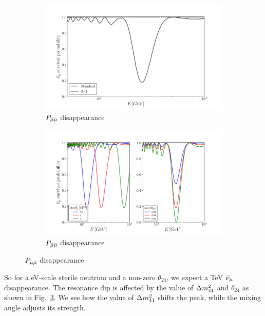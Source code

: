 \documentclass{thesis}
\begin{document}
\begin{figure}
    \begin{subfigure}{0.45\textwidth}
        \includegraphics[width=1\linewidth]{figures/sterile_resonance.pdf}
        \caption{$P_{\bar{\mu} \bar{\mu}}$ disappearance}\label{fig:sterile_resonance}
    \end{subfigure}
    \begin{subfigure}{0.45\textwidth}
        \includegraphics[width=1\linewidth]{figures/resonance_shift.pdf}
        \caption{$P_{\bar{\mu} \bar{\mu}}$ disappearance}\label{fig:resonance_shift}
    \end{subfigure}
\end{figure}

So for a \si{\eV}-scale sterile neutrino and a non-zero $\theta_{24}$, we expect a \si{\TeV} $\bar{\nu}_\mu$ disappearance.
The resonance dip is affected by the value of $\dm[41]$ and $\theta_{24}$ as shown in Fig.~\ref{fig:resonance_shift}.
We see how the value of $\dm[41]$ shifts the peak, while the mixing angle adjusts its strength. 



\newpage


\end{document}
